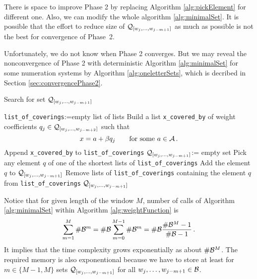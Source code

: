 There is space to improve Phase 2 by replacing Algorithm \ref{alg:pickElement} for different one. Also, we can modify the whole algorithm \ref{alg:minimalSet}. It is possible that the effort to reduce size of  $\mathcal{Q}_{[w_j,\dots, w_{j-m+1}]}$ as much as possible is not the best for convergence of Phase~2.

Unfortunately, we do not know when Phase 2 converges. But  we may reveal the nonconvergence of Phase 2 with deterministic Algorithm \ref{alg:minimalSet} for some numeration systems by Algorithm \ref{alg:oneletterSets}, which is decribed in Section \ref{sec:convergencePhase2}.

\begin{algorithm}
  \caption{Search for set $\mathcal{Q}_{[w_j,\dots, w_{j-m+1}]}$ }
    \label{alg:minimalSet}
  \begin{algorithmic}[1]
    \STATE \verb+list_of_coverings+:=empty list of lists
        \STATE Build a list \verb+x_covered_by+ of weight coefficients $q_j \in \mathcal{Q}_{[w_j,\dots, w_{j-m+2}]}$ such that 
        $$
        x=a+ \beta q_j \qquad\text{for some } a\in\mathcal{A}\,.
        $$ 
        \vspace{-20pt}
        \STATE Append \verb+x_covered_by+ to \verb+list_of_coverings+
    \ENDFOR
    \STATE $\mathcal{Q}_{[w_j,\dots, w_{j-m+1}]}$:= empty set
        \STATE Pick any element $q$ of one of the shortest lists of \verb+list_of_coverings+ \label{line:pickElement}
        \STATE Add the element $q$ to $\mathcal{Q}_{[w_j,\dots, w_{j-m+1}]}$
        \STATE Remove lists of \verb+list_of_coverings+ containing the element $q$ from \verb+list_of_coverings+
    \ENDWHILE
    \RETURN $\mathcal{Q}_{[w_j,\dots, w_{j-m+1}]}$
  \end{algorithmic}
\end{algorithm}



Notice that for given length of the window $M$, number of calls of Algorithm \ref{alg:minimalSet} within Algorithm \ref{alg:weightFunction} is
$$
\sum_{m=1}^M  \#\mathcal{B}^m = \#\mathcal{B} \sum_{m=0}^{M-1}  \#\mathcal{B}^m = \#\mathcal{B} \frac{\#\mathcal{B}^M-1}{\#\mathcal{B}-1}\,.
$$    
It implies that the time complexity grows exponentially as about $\#\mathcal{B}^M$. The required memory is also exponentional because we have to store at least for $m\in\{M-1,M\}$ sets $\mathcal{Q}_{[w_j,\dots, w_{j-m+1}]}$ for all $w_j,\dots, w_{j-m+1} \in \mathcal{B}$.

